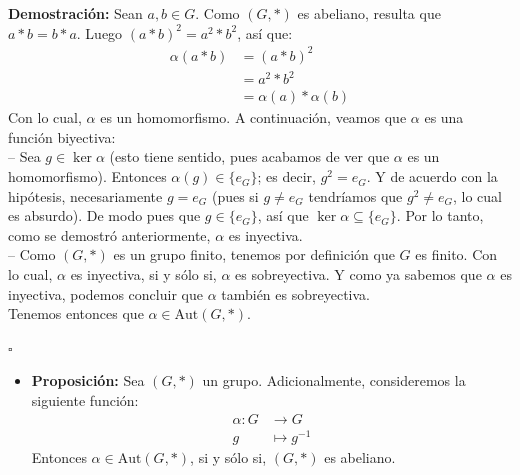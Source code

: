\documentclass[10 pt]{article}
\begin{document}
\Large{\textbf{Demostración:} Sean $a,b \in G$. Como $(G,*)$ es abeliano, resulta que $a*b=b*a$. Luego $(a*b)^2=a^2*b^2$, así que:}
\begin{align*}
    \alpha(a*b)&=(a*b)^2 \\
    &=a^2*b^2 \\
    &=\alpha(a)*\alpha(b)
\end{align*}
\Large{Con lo cual, $\alpha$ es un homomorfismo. A continuación, veamos que $\alpha$ es una función biyectiva: \\

-- Sea $g \in \ker \alpha$ (esto tiene sentido, pues acabamos de ver que $\alpha$ es un homomorfismo). Entonces $\alpha(g) \in \{e_G\}$; es decir, $g^2=e_G$. Y de acuerdo con la hipótesis, necesariamente $g=e_G$ (pues si $g \neq e_G$ tendríamos que $g^2 \neq e_G$, lo cual es absurdo). De modo pues que $g \in \{e_G\}$, así que $\ker \alpha \subseteq \{e_G\}$. Por lo tanto, como se demostró anteriormente, $\alpha$ es inyectiva. \\ 

-- Como $(G,*)$ es un grupo finito, tenemos por definición que $G$ es finito. Con lo cual, $\alpha$ es inyectiva, si y sólo si, $\alpha$ es sobreyectiva. Y como ya sabemos que $\alpha$ es inyectiva, podemos concluir que $\alpha$ también es sobreyectiva. \\

Tenemos entonces que $\alpha \in \text{Aut}(G,*)$.} \\

\begin{flushright}
    $\square$
\end{flushright}

\begin{itemize}
    \item \Large{\textbf{Proposición:} Sea $(G,*)$ un grupo. Adicionalmente, consideremos la siguiente función:}
    \begin{align*}
        \alpha:G &\rightarrow G \\
        g &\mapsto g^{-1}
    \end{align*}
    \Large{Entonces $\alpha \in \text{Aut}(G,*)$, si y sólo si, $(G,*)$ es abeliano.} \\
\end{itemize}
\end{document}
